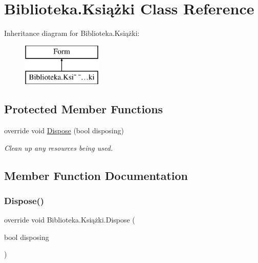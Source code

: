 \hypertarget{class_biblioteka_1_1_ksi_xC4_x85_xC5_xBCki}{}\section{Biblioteka.\+Książki Class Reference}
\label{class_biblioteka_1_1_ksi_xC4_x85_xC5_xBCki}
Inheritance diagram for Biblioteka.\+Książki\+:\begin{figure}[H]
\begin{center}
\leavevmode
\includegraphics[height=2.000000cm]{class_biblioteka_1_1_ksi_xC4_x85_xC5_xBCki}
\end{center}
\end{figure}
\subsection*{Protected Member Functions}
\begin{DoxyCompactItemize}
\item 
override void \hyperlink{class_biblioteka_1_1_ksi_xC4_x85_xC5_xBCki_a3b820e000ec4ac60b7dc5d7c9da7660b}{Dispose} (bool disposing)
\begin{DoxyCompactList}\small\item\em Clean up any resources being used. \end{DoxyCompactList}\end{DoxyCompactItemize}


\subsection{Member Function Documentation}
\mbox{\label{class_biblioteka_1_1_ksi_xC4_x85_xC5_xBCki_a3b820e000ec4ac60b7dc5d7c9da7660b}} 
\subsubsection{\texorpdfstring{Dispose()}{Dispose()}}
{\footnotesize\ttfamily override void Biblioteka.\+Książki.\+Dispose (\begin{DoxyParamCaption}\item[{bool}]{disposing }\end{DoxyParamCaption})\hspace{0.3cm}{\ttfamily [protected]}}



